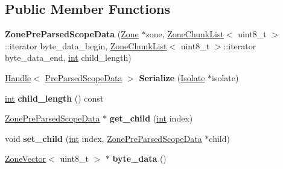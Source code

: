 \subsection*{Public Member Functions}
\begin{DoxyCompactItemize}
\item 
\mbox{\label{classv8_1_1internal_1_1ZonePreParsedScopeData_abe6efdc0661e15d1280a69ff8539fee9}} 
{\bfseries Zone\+Pre\+Parsed\+Scope\+Data} (\mbox{\hyperlink{classv8_1_1internal_1_1Zone}{Zone}} $\ast$zone, \mbox{\hyperlink{classv8_1_1internal_1_1ZoneChunkList}{Zone\+Chunk\+List}}$<$ uint8\+\_\+t $>$\+::iterator byte\+\_\+data\+\_\+begin, \mbox{\hyperlink{classv8_1_1internal_1_1ZoneChunkList}{Zone\+Chunk\+List}}$<$ uint8\+\_\+t $>$\+::iterator byte\+\_\+data\+\_\+end, \mbox{\hyperlink{classint}{int}} child\+\_\+length)
\item 
\mbox{\label{classv8_1_1internal_1_1ZonePreParsedScopeData_a0df8bd4178733df02304516291ed9e6b}} 
\mbox{\hyperlink{classv8_1_1internal_1_1Handle}{Handle}}$<$ \mbox{\hyperlink{classv8_1_1internal_1_1PreParsedScopeData}{Pre\+Parsed\+Scope\+Data}} $>$ {\bfseries Serialize} (\mbox{\hyperlink{classv8_1_1internal_1_1Isolate}{Isolate}} $\ast$isolate)
\item 
\mbox{\label{classv8_1_1internal_1_1ZonePreParsedScopeData_a895463a3748f32ead187609c9046b3c0}} 
\mbox{\hyperlink{classint}{int}} {\bfseries child\+\_\+length} () const
\item 
\mbox{\label{classv8_1_1internal_1_1ZonePreParsedScopeData_a88deb729aa0acf55028389d1f4daa05f}} 
\mbox{\hyperlink{classv8_1_1internal_1_1ZonePreParsedScopeData}{Zone\+Pre\+Parsed\+Scope\+Data}} $\ast$ {\bfseries get\+\_\+child} (\mbox{\hyperlink{classint}{int}} index)
\item 
\mbox{\label{classv8_1_1internal_1_1ZonePreParsedScopeData_a30ea7e535a6ca018cc965a08d867b4f6}} 
void {\bfseries set\+\_\+child} (\mbox{\hyperlink{classint}{int}} index, \mbox{\hyperlink{classv8_1_1internal_1_1ZonePreParsedScopeData}{Zone\+Pre\+Parsed\+Scope\+Data}} $\ast$child)
\item 
\mbox{\label{classv8_1_1internal_1_1ZonePreParsedScopeData_ab68e757c369c2420b22aabf451dc8696}} 
\mbox{\hyperlink{classv8_1_1internal_1_1ZoneVector}{Zone\+Vector}}$<$ uint8\+\_\+t $>$ $\ast$ {\bfseries byte\+\_\+data} ()
\end{DoxyCompactItemize}



